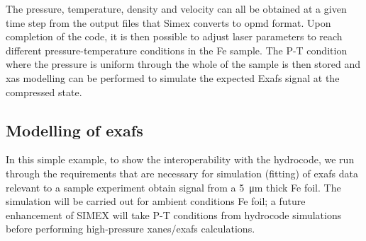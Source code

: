  The pressure, temperature, density and velocity can all be obtained at a given
 time step from the output files that Simex converts to opmd format. Upon
 completion of the code, it is then possible to adjust laser parameters to reach
 different pressure-temperature conditions in the Fe sample. The P-T condition
 where the pressure is uniform through the whole of the sample is then stored and
 \gls{xas} modelling can be performed to simulate the expected E\gls{xafs} signal at
 the compressed state.
%
 \begin{figure}
 \end{figure}
%
 \subsection{Modelling of \gls{exafs}}
In this simple example, to show the interoperability with the hydrocode,
we run through the requirements that are necessary for
simulation (fitting) of \gls{exafs} data relevant to a sample experiment obtain signal
from a \SI{5}{\micro\metre} thick Fe foil. The simulation will be carried out for
ambient conditions Fe foil; a future enhancement of SIMEX will take P-T
conditions from hydrocode simulations before performing high-pressure
\gls{xanes}/\gls{exafs} calculations.

